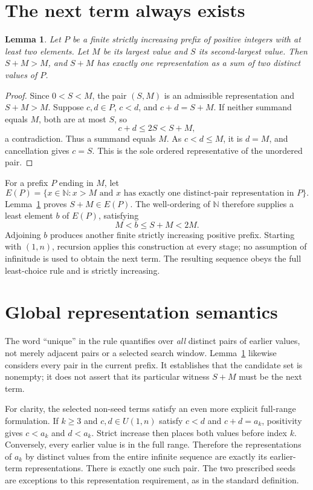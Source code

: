 \documentclass[11pt,a4paper]{article}
\newtheorem{lemma}[theorem]{Lemma}
\newcommand{\N}{\mathbb{N}}
\begin{document}
\section{The next term always exists}
\begin{lemma}\label{lem:pair}
Let $P$ be a finite strictly increasing prefix of positive integers with at least two elements. Let $M$ be its largest value and $S$ its second-largest value. Then $S+M>M$, and $S+M$ has exactly one representation as a sum of two distinct values of $P$.
\end{lemma}
\begin{proof}
Since $0<S<M$, the pair $(S,M)$ is an admissible representation and $S+M>M$. Suppose $c,d\in P$, $c<d$, and $c+d=S+M$. If neither summand equals $M$, both are at most $S$, so
\[
c+d\le2S<S+M,
\]
a contradiction. Thus a summand equals $M$. As $c<d\le M$, it is $d=M$, and cancellation gives $c=S$. This is the sole ordered representative of the unordered pair.
\end{proof}

For a prefix $P$ ending in $M$, let
\[
E(P)=\{x\in\N:x>M\text{ and }x\text{ has exactly one distinct-pair representation in }P\}.
\]
Lemma~\ref{lem:pair} proves $S+M\in E(P)$. The well-ordering of $\N$ therefore supplies a least element $b$ of $E(P)$, satisfying
\begin{equation}\label{eq:step}
M<b\le S+M<2M.
\end{equation}
Adjoining $b$ produces another finite strictly increasing positive prefix. Starting with $(1,n)$, recursion applies this construction at every stage; no assumption of infinitude is used to obtain the next term. The resulting sequence obeys the full least-choice rule and is strictly increasing.

\section{Global representation semantics}
The word ``unique'' in the rule quantifies over \emph{all} distinct pairs of earlier values, not merely adjacent pairs or a selected search window. Lemma~\ref{lem:pair} likewise considers every pair in the current prefix. It establishes that the candidate set is nonempty; it does not assert that its particular witness $S+M$ must be the next term.

For clarity, the selected non-seed terms satisfy an even more explicit full-range formulation. If $k\ge3$ and $c,d\in U(1,n)$ satisfy $c<d$ and $c+d=a_k$, positivity gives $c<a_k$ and $d<a_k$. Strict increase then places both values before index $k$. Conversely, every earlier value is in the full range. Therefore the representations of $a_k$ by distinct values from the entire infinite sequence are exactly its earlier-term representations. There is exactly one such pair. The two prescribed seeds are exceptions to this representation requirement, as in the standard definition.
\end{document}
